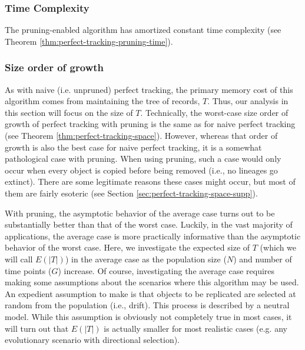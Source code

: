 

\subsubsection{Time Complexity}

The pruning-enabled algorithm has amortized constant time complexity (see Theorem \ref{thm:perfect-tracking-pruning-time}).



\subsubsection{Size order of growth}
\label{sec:perfect-tracking-pruning-space}

As with naive (i.e. unpruned) perfect tracking, the primary memory cost of this algorithm comes from maintaining the tree of records, $T$.
Thus, our analysis in this section will focus on the size of $T$.
Technically, the worst-case size order of growth of perfect tracking with pruning is the same as for naive perfect tracking (see Theorem \ref{thm:perfect-tracking-space}).
However, whereas that order of growth is also the best case for naive perfect tracking, it is a somewhat pathological case with pruning.
When using pruning, such a case would only occur when every object is copied before being removed (i.e., no lineages go extinct).
There are some legitimate reasons these cases might occur, but most of them are fairly esoteric (see Section \ref{sec:perfect-tracking-space-supp}).


With pruning, the asymptotic behavior of the average case turns out to be substantially better than that of the worst case. 
Luckily, in the vast majority of applications, the average case is more practically informative than the asymptotic behavior of the worst case.
Here, we investigate the expected size of $T$ (which we will call $E(|T|)$) in the average case as the population size ($N$) and number of time points ($G$) increase.
Of course, investigating the average case requires making some assumptions about the scenarios where this algorithm may be used.
An expedient assumption to make is that objects to be replicated are selected at random from the population (i.e., drift).
This process is described by a neutral model.
While this assumption is obviously not completely true in most cases, it will turn out that $E(|T|)$ is actually smaller for most realistic cases (e.g. any evolutionary scenario with directional selection).

